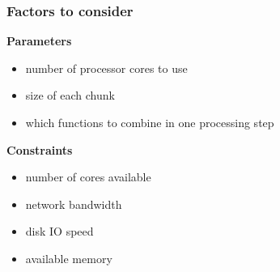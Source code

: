 \documentclass{beamer}
\begin{document}
\begin{frame}

    \frametitle{Factors to consider}

\textbf{Parameters}
\begin{itemize}
    \item number of processor cores to use
    \item size of each chunk
    \item which functions to combine in one processing step
\end{itemize}

\textbf{Constraints}
\begin{itemize}
    \item number of cores available
    \item network bandwidth
    \item disk IO speed
    \item available memory
\end{itemize}

%
%
%

%
%
%
%
%
\end{frame}
\end{document}
